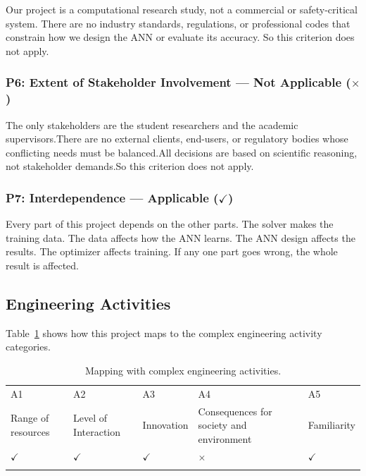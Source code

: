 Our project is a computational research study, not a commercial or safety-critical system. There are no industry standards, regulations, or professional codes that constrain how we design the ANN or evaluate its accuracy. So this criterion does not apply.

\subsubsection{P6: Extent of Stakeholder Involvement --- Not Applicable ($\times$)}

The only stakeholders are the student researchers and the academic supervisors.There are no external clients, end-users, or regulatory bodies whose conflicting needs must be balanced.All decisions are based on scientific reasoning, not stakeholder demands.So this criterion does not apply.

\subsubsection{P7: Interdependence --- Applicable ($\checkmark$)}

Every part of this project depends on the other parts. The solver makes the training data. The data affects how the ANN learns. The ANN design affects the results. The optimizer affects training. If any one part goes wrong, the whole result is affected.


\subsection{Engineering Activities}

Table~\ref{tab:e_act} shows how this project maps to the complex engineering activity categories.

\begin{center}
    \begin{table}[ht]
        \centering
        \caption{Mapping with complex engineering activities.}
        \begin{tabular}{|p{}|p{}|p{}|p{}|p{}|}
        \hline
        A1& A2& A3& A4& A5\\
        Range of resources & Level of Interaction & Innovation & Consequences for society and environment & Familiarity\\
        \hline 
        $\checkmark$ & $\checkmark$ & $\checkmark$ & $\times$ & $\checkmark$\\
        &&&&\\
        \hline 
        \end{tabular}
        \label{tab:e_act}
    \end{table}
\end{center}

